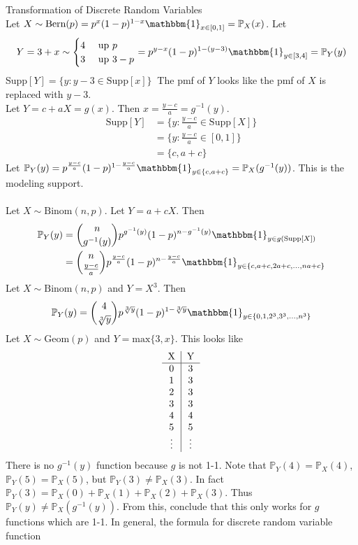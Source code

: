 \documentclass[12pt]{article}
\newcommand{\probsub}[2]{\mathbb{P}_{#1}(#2)}
\newcommand{\indicator}[1]{\mathbbm{1}_{#1}}
\newcommand{\supp}[1]{\text{Supp}[ #1 ]}
\renewcommand{\max}[1]{\text{max}\{#1\}}
\newcommand{\ginvy}{g^{-1}(y)}
\begin{document}
Transformation of Discrete Random Variables \\
Let $X \sim \text{Bern}(p) = p^x(1 - p)^{1 - x} \indicator{x \in [0,1]} = \probsub{X}{x}$. Let $$Y = 3 + x \sim \begin{cases} 4 &\text{ up } p \\ 3 &\text{ up } 3 - p \end{cases} = p^{y - x}(1 - p)^{1 - (y - 3)} \indicator{y \in [3, 4]} = \probsub{Y}{y} $$ Supp$[Y] = \{y: y -3 \in \text{Supp}[x]\}~$ The pmf of $Y$ looks like the pmf of $X$ is replaced with $y - 3$. \\
Let $Y = c + aX = g(x)$. Then $x = \frac{y - c}{a} = \ginvy$. $$\begin{aligned} 
\text{Supp}[Y] &= \{y : \frac{y - c}{a} \in \supp{X}\} \\ &= \{ y: \frac{y - c}{a} \in [0, 1]\} \\ &= \{c, a + c\} \end{aligned} $$ 
Let $\probsub{Y}{y} = p^{\frac{y - c}{a}}(1 - p)^{1 - \frac{y - c}{a}} \indicator{y \in \{c, a + c\}} = \probsub{X}{\ginvy}$. This is the modeling support. \\~\\
Let $X \sim \text{Binom}(n, p)$. Let $Y = a + cX$. Then $$ \begin{aligned} \probsub{Y}{y} &= \binom{n}{\ginvy} p^{\ginvy}(1 - p)^{n - \ginvy} \indicator{y \in g(\supp{X})} \\ &= \binom{n}{\frac{y - c}{a}} p^{\frac{y - c}{a}} (1 - p)^{n - \frac{y - c}{a}} \indicator{y \in \{c, a + c, 2a + c, \dots, na + c\}} \end{aligned} $$ 
Let $X \sim \text{Binom}(n, p)$ and $Y = X^3$. Then 
$$\probsub{Y}{y} = \binom{4}{\sqrt[3]{y}} p^{\sqrt[3]{y}}(1 - p)^{1 - \sqrt[3]{y}} \indicator{y \in \{0, 1, 2^3, 3^3, \dots, n^3\}}$$ 
Let $X \sim \text{Geom}(p)$ and $Y = \max{3, x}$. This looks like $$\begin{tabular}{c|c} X & Y \\ \hline 0 & 3 \\ 1 & 3 \\ 2 & 3 \\ 3 & 3 \\ 4 & 4 \\ 5 & 5 \\ \vdots & \vdots \end{tabular}$$ 
There is no $\ginvy$ function because $g$ is not 1-1. Note that $\probsub{Y}{4} = \probsub{X}{4}$, $\probsub{Y}{5} = \probsub{X}{5}$, but $\probsub{Y}{3} \neq \probsub{X}{3}$. In fact $\probsub{Y}{3} = \probsub{X}{0} + \probsub{X}{1} + \probsub{X}{2} + \probsub{X}{3}$. Thus $\probsub{Y}{y} \neq \probsub{X}{\ginvy}$. From this, conclude that this only works for $g$ functions which are 1-1. In general, the formula for discrete random variable function 
\end{document}
